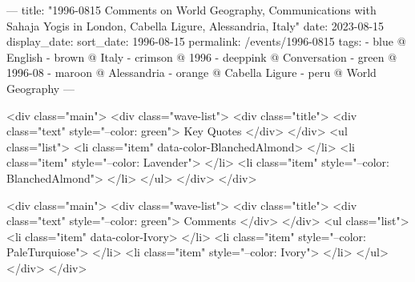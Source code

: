 ---
title: "1996-0815 Comments on World Geography, Communications with Sahaja Yogis in London, Cabella Ligure, Alessandria, Italy"
date: 2023-08-15
display_date: 
sort_date: 1996-08-15
permalink: /events/1996-0815
tags:
  - blue @ English
  - brown @ Italy
  - crimson @ 1996
  - deeppink @ Conversation
  - green @ 1996-08
  - maroon @ Alessandria
  - orange @ Cabella Ligure
  - peru @ World Geography
---

<div class="main">
  <div class="wave-list">
    <div class="title">
      <div class="text" style="--color: green">
        Key Quotes
      </div>
    </div>
    <ul class="list">
        <li class="item" data-color-BlanchedAlmond>
        </li>
        <li class="item" style="--color: Lavender">
        </li>
        <li class="item" style="--color: BlanchedAlmond">
        </li>
      </ul>
  </div>
</div>

<div class="main">
  <div class="wave-list">
    <div class="title">
      <div class="text" style="--color: green">
        Comments
      </div>
    </div>
    <ul class="list">
        <li class="item" data-color-Ivory>
        </li>
        <li class="item" style="--color: PaleTurquiose">
        </li>
        <li class="item" style="--color: Ivory">
        </li>
      </ul>
  </div>
</div>